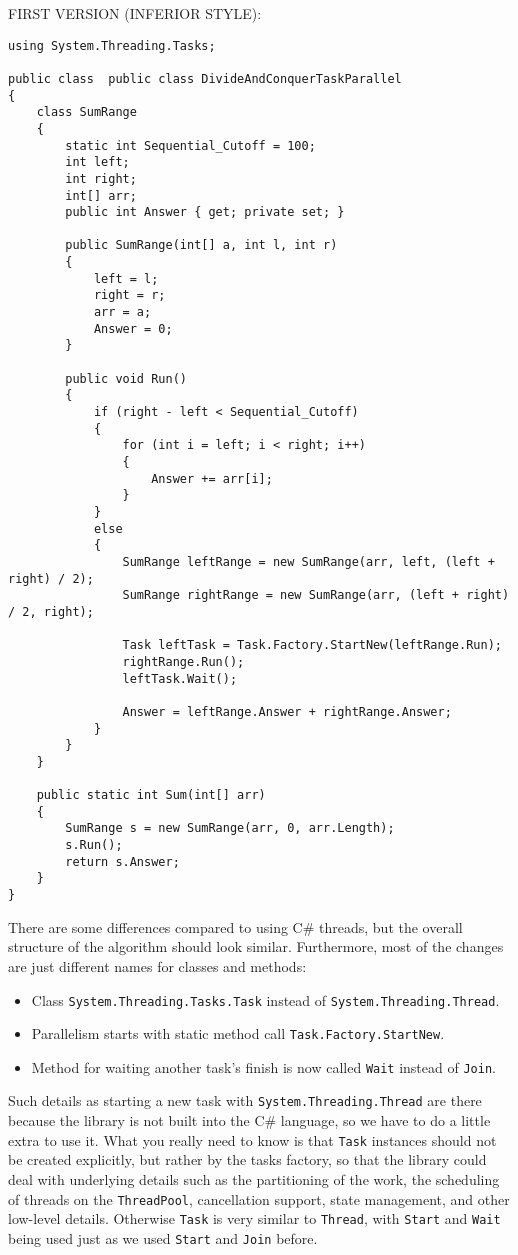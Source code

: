 \documentclass[10pt]{article}
\begin{document}
\medskip
\noindent FIRST VERSION (INFERIOR STYLE):

\begin{verbatim}
using System.Threading.Tasks;

public class  public class DivideAndConquerTaskParallel
{
    class SumRange
    {
        static int Sequential_Cutoff = 100;
        int left;
        int right;
        int[] arr;
        public int Answer { get; private set; }

        public SumRange(int[] a, int l, int r)
        {
            left = l;
            right = r;
            arr = a;
            Answer = 0;
        }

        public void Run()
        {
            if (right - left < Sequential_Cutoff)
            {
                for (int i = left; i < right; i++)
                {
                    Answer += arr[i];
                }
            }
            else
            {
                SumRange leftRange = new SumRange(arr, left, (left + right) / 2);
                SumRange rightRange = new SumRange(arr, (left + right) / 2, right);

                Task leftTask = Task.Factory.StartNew(leftRange.Run);
                rightRange.Run();
                leftTask.Wait();

                Answer = leftRange.Answer + rightRange.Answer;
            }
        }
    }

    public static int Sum(int[] arr)
    {
        SumRange s = new SumRange(arr, 0, arr.Length);
        s.Run();
        return s.Answer;
    }
}
\end{verbatim}

There are some differences compared to using C\# threads, but 
the overall structure of the algorithm should look similar. 
Furthermore, most of the changes are just different names for classes and methods:
\begin{itemize}
\item Class {\tt System.Threading.Tasks.Task} instead of {\tt System.Threading.Thread}.
\item Parallelism starts with static method call {\tt Task.Factory.StartNew}.
\item Method for waiting another task's finish is now called {\tt Wait} instead of {\tt Join}.
\end{itemize}

Such details as starting a new task with {\tt System.Threading.Thread} 
are there because the library is not built into the C\# language, so 
we have to do a little extra to use it. What you really need to know is 
that {\tt Task} instances should not be created explicitly, but rather 
by the tasks factory, so that the library could deal with underlying 
details such as the partitioning of the work, the scheduling of threads 
on the {\tt ThreadPool}, cancellation support, state management, and 
other low-level details. Otherwise {\tt Task} is very similar to {\tt Thread}, 
with {\tt Start} and {\tt Wait} being used just as we used {\tt Start} 
and {\tt Join} before.
\end{document}
